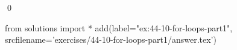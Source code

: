 
\begin{ex}
  \label{ex:44-10-for-loops-part1}
  
  \qed
\end{ex}
\begin{python0}
from solutions import *
add(label="ex:44-10-for-loops-part1",
    srcfilename='exercises/44-10-for-loops-part1/answer.tex')
\end{python0}

